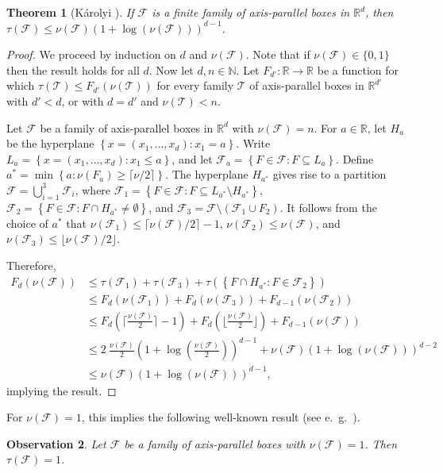 \documentclass[12pt]{amsart}
\theoremstyle{plain}
\newtheorem{theorem}{Theorem}[section]
\newtheorem{observation}[theorem]{Observation}
\theoremstyle{definition}
\theoremstyle{remark}
\newcommand{\F}{\mathcal{F}}
\newcommand{\R}{\mathbb{R}}
\newcommand{\T}{\mathcal{T}}
\newcommand{\sset}[1]{\left\{#1\right\}}
\newcommand{\ceil}[1]{\lceil#1\rceil}
\newcommand{\floor}[1]{\lfloor#1\rfloor}
\begin{document}
\begin{theorem}[K\'arolyi \cite{karolyi}] \label{karolyi} If $\F$ is a finite family of axis-parallel boxes in $\R^d$, then $\tau(\F) \leq \nu(\F) \left(1 + \log\left(\nu(\F)\right)\right)^{d-1}$. 
\end{theorem}
\begin{proof}
We proceed by induction on $d$ and $\nu(\F)$. Note that if $\nu(\F) \in \{0, 1\}$ then the result holds for all $d$. Now let $d, n \in \mathbb{N}$. Let $F_{d'}:\R \to \R$ be a function for which $\tau(\T) \le F_{d'}(\nu(\T))$ for every family $\T$ of axis-parallel boxes in $\R^{d'}$ with $d' < d$, or with $d=d'$ and $\nu(\T) < n$.

Let $\F$ be a family of axis-parallel boxes in $\R^d$ with $\nu(\F) = n$. For $a \in \R$, let $H_a$ be the hyperplane $\sset{x = (x_1, \dots, x_d) : x_1=a}$. Write $L_a = \sset{x = (x_1, \dots, x_d) : x_1 \leq a}$, and let $\F_a = \sset{F \in \F: F \subseteq L_a}$. Define $a^* = \min \sset{a : \nu(F_a) \geq \ceil{\nu/2}}$. The hyperplane $H_{a^*}$ gives rise to a partition $\F=\bigcup_{i=1}^3\F_i$, where $\F_1 = \sset{F \in \F : F \subseteq L_{a^*} \setminus H_{a^*}}$, $\F_2 = \sset{F \in \F: F \cap H_{a^*} \neq \emptyset}$, and $\F_3 = \F \setminus (\F_1 \cup F_2)$. It follows from the choice of $a^*$ that $\nu(\F_1) \leq \ceil{\nu(\F)/2}-1$, $\nu(\F_2) \leq \nu(\F)$, and $\nu(\F_3) \leq \floor{\nu(\F)/2}$. 

Therefore, 
\begin{align*}
F_d(\nu(\F)) &\le \tau(\F_1) + \tau(\F_3) + \tau(\sset{F\cap H_{a^*} : F\in \F_2})\\
&\le F_d(\nu(\F_1)) + F_d(\nu(\F_3)) + F_{d-1}(\nu(\F_2))\\
&\le F_d(\Big\lceil\frac{\nu(\F)}{2}\Big\rceil-1) + F_d(\Big\lfloor\frac{\nu(\F)}{2}\Big\rfloor) + F_{d-1}(\nu(\F)) \\
&\le 2~\frac{\nu(\F)}{2}  \left(1 + \log\left(\frac{\nu(\F)}{2}\right)\right)^{d-1} + \nu(\F)  \left(1 + \log\left(\nu(\F)\right)\right)^{d-2} \\
&\le \nu(\F) \left(1 + \log\left(\nu(\F)\right)\right)^{d-1}, 
\end{align*}
implying the result. 
\end{proof} 
For $\nu(\F) = 1$, this implies the following well-known result (see e.\ g.\ \cite{fonderflaass}). 
\begin{observation} \label{obs:pairwise} Let $\F$ be a family of axis-parallel boxes with $\nu(\F) = 1$. Then $\tau(\F) = 1$. 
\end{observation}
\end{document}
